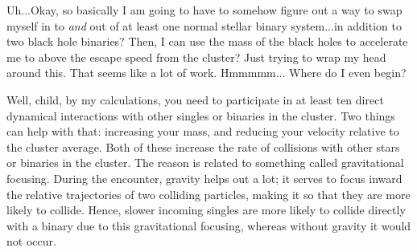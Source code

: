 \documentclass[main.tex]{subfiles}
\begin{document}
\par \Sterope  Uh...Okay, so basically I am going to have to somehow figure out a way to swap myself in to \textit{and} out of at least one normal stellar binary system...in addition to two black hole binaries?  Then, I can use the mass of the black holes to accelerate me to above the escape speed from the cluster?  Just trying to wrap my head around this.  That seems like a lot of work.  Hmmmmm... Where do I even begin?

\par \Enrico Well, child, by my calculations, you need to participate in at least ten direct dynamical interactions with other singles or binaries in the cluster.  Two things can help with that:  increasing your mass, and reducing your velocity relative to the cluster average.  Both of these increase the rate of collisions with other stars or binaries in the cluster.  The reason is related to something called gravitational focusing.  During the encounter, gravity helps out a lot; it serves to focus inward the relative trajectories of two colliding particles, making it so that they are more likely to collide.  Hence, slower incoming singles are more likely to collide directly with a binary due to this gravitational focusing, whereas without gravity it would not occur.
\end{document}
